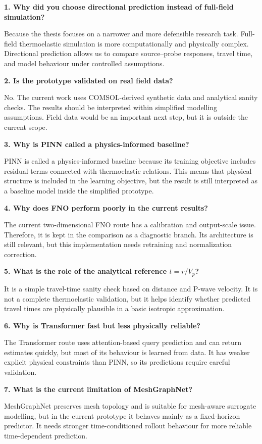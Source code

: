 \documentclass[11pt,a4paper]{article}
\begin{document}
\textbf{1. Why did you choose directional prediction instead of full-field simulation?}

Because the thesis focuses on a narrower and more defensible research task. Full-field thermoelastic simulation is more computationally and physically complex. Directional prediction allows us to compare source--probe responses, travel time, and model behaviour under controlled assumptions.

\textbf{2. Is the prototype validated on real field data?}

No. The current work uses COMSOL-derived synthetic data and analytical sanity checks. The results should be interpreted within simplified modelling assumptions. Field data would be an important next step, but it is outside the current scope.

\textbf{3. Why is PINN called a physics-informed baseline?}

PINN is called a physics-informed baseline because its training objective includes residual terms connected with thermoelastic relations. This means that physical structure is included in the learning objective, but the result is still interpreted as a baseline model inside the simplified prototype.

\textbf{4. Why does FNO perform poorly in the current results?}

The current two-dimensional FNO route has a calibration and output-scale issue. Therefore, it is kept in the comparison as a diagnostic branch. Its architecture is still relevant, but this implementation needs retraining and normalization correction.

\textbf{5. What is the role of the analytical reference $t=r/V_p$?}

It is a simple travel-time sanity check based on distance and P-wave velocity. It is not a complete thermoelastic validation, but it helps identify whether predicted travel times are physically plausible in a basic isotropic approximation.

\textbf{6. Why is Transformer fast but less physically reliable?}

The Transformer route uses attention-based query prediction and can return estimates quickly, but most of its behaviour is learned from data. It has weaker explicit physical constraints than PINN, so its predictions require careful validation.

\textbf{7. What is the current limitation of MeshGraphNet?}

MeshGraphNet preserves mesh topology and is suitable for mesh-aware surrogate modelling, but in the current prototype it behaves mainly as a fixed-horizon predictor. It needs stronger time-conditioned rollout behaviour for more reliable time-dependent prediction.
\end{document}
